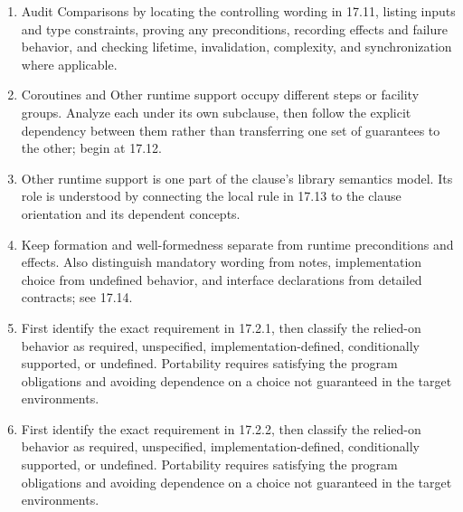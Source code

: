 \documentclass[11pt,letterpaper]{article}
\begin{document}
\begin{enumerate}
\item Audit Comparisons by locating the controlling wording in 17.11, listing inputs and type constraints, proving any preconditions, recording effects and failure behavior, and checking lifetime, invalidation, complexity, and synchronization where applicable.
\item Coroutines and Other runtime support occupy different steps or facility groups. Analyze each under its own subclause, then follow the explicit dependency between them rather than transferring one set of guarantees to the other; begin at 17.12.
\item Other runtime support is one part of the clause's library semantics model. Its role is understood by connecting the local rule in 17.13 to the clause orientation and its dependent concepts.
\item Keep formation and well-formedness separate from runtime preconditions and effects. Also distinguish mandatory wording from notes, implementation choice from undefined behavior, and interface declarations from detailed contracts; see 17.14.
\item First identify the exact requirement in 17.2.1, then classify the relied-on behavior as required, unspecified, implementation-defined, conditionally supported, or undefined. Portability requires satisfying the program obligations and avoiding dependence on a choice not guaranteed in the target environments.
\item First identify the exact requirement in 17.2.2, then classify the relied-on behavior as required, unspecified, implementation-defined, conditionally supported, or undefined. Portability requires satisfying the program obligations and avoiding dependence on a choice not guaranteed in the target environments.
\end{enumerate}
\end{document}
